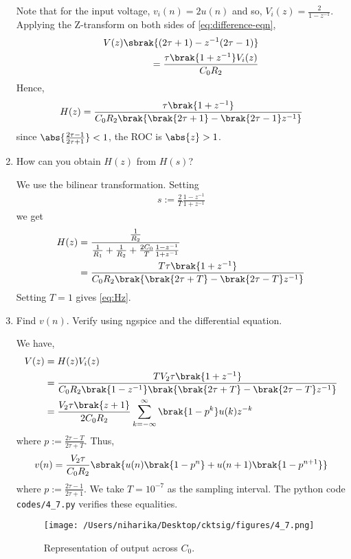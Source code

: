 \documentclass[journal,12pt,twocolumn]{IEEEtran}
\renewcommand\thesection{\arabic{section}}
\begin{document}
\begin{enumerate}[label=\arabic*.,ref=\thesection.\theenumi]
\solution Note that for the input voltage, $v_i(n) = 2u(n)$ and
so, $V_i(z) = \frac{2}{1-z^{-1}}$. Applying the Z-transform
on both sides of \eqref{eq:difference-eqn},
\begin{align}
    V(z)\sbrak{(2\tau + 1) - z^{-1}(2\tau - 1)} \nonumber \\
    = \frac{\tau\brak{1 + z^{-1}}V_i(z)}{C_0R_2}
\end{align}
Hence,
\begin{align}
    H(z) = \frac{\tau\brak{1+z^{-1}}}{C_0R_2\brak{\brak{2\tau+1}-\brak{2\tau-1}z^{-1}}}
    \label{eq:Hz}
\end{align}
since $\abs{\frac{2\tau-1}{2\tau+1}} < 1$, the ROC is $\abs{z} > 1$.
\item How can you obtain $H(z)$ from $H(s)$?

\solution We use the bilinear transformation. Setting
\begin{align}
    s := \frac{2}{T}\frac{1 - z^{-1}}{1 + z^{-1}}
\end{align}
we get
\begin{align}
    H(z) &= \frac{\frac{1}{R_2}}{\frac{1}{R_1} + \frac{1}{R_2} + \frac{2C_0}{T}\frac{1 - z^{-1}}{1 + z^{-1}}} \\
         &= \frac{T\tau\brak{1+z^{-1}}}{C_0R_2\brak{\brak{2\tau+T}-\brak{2\tau-T}z^{-1}}}
\end{align}
Setting $T = 1$ gives \eqref{eq:Hz}.

\item Find $v(n)$. Verify using ngspice and the differential equation.

\solution We have,
\begin{align}
    V(z) &= H(z)V_i(z) \\
         &= \frac{TV_2\tau\brak{1+z^{-1}}}{C_0R_2\brak{1-z^{-1}}\brak{\brak{2\tau+T}-\brak{2\tau-T}z^{-1}}} \\
         &= \frac{V_2\tau\brak{z+1}}{2C_0R_2}\sum_{k=-\infty}^{\infty}\brak{1-p^k}u(k)z^{-k}
\end{align}
where $p := \frac{2\tau-T}{2\tau+T}$. Thus,
\begin{align}
    v(n) = \frac{V_2\tau}{C_0R_2}\sbrak{u(n)\brak{1-p^n}+u(n+1)\brak{1-p^{n+1}}}
\end{align}
where $p := \frac{2\tau-1}{2\tau+1}$. We take $T = 10^{-7}$ as the
sampling interval. The python code \texttt{codes/4\_7.py} verifies
these equalities.
\begin{figure}
    \texttt{[image: /Users/niharika/Desktop/cktsig/figures/4\_7.png]}
    \caption{Representation of output across $C_0$.}
    \label{fig:vc0}
\end{figure}
\end{enumerate}
\end{document}
